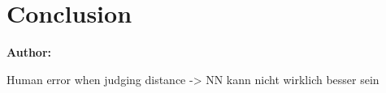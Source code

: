 \chapter{Conclusion}

\textbf{Author: } 

Human error when judging distance -> NN kann nicht wirklich besser sein

\filbreak